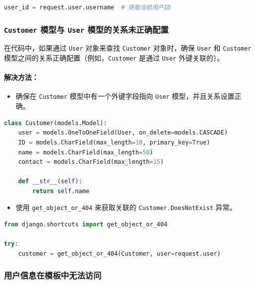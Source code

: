 \documentclass[UTF8,a4paper,12pt]{ctexart}
\begin{document}
\begin{lstlisting}[language=Python]
    user_id = request.user.username  # 获取当前用户ID
\end{lstlisting}

\subsubsection{\texttt{Customer} 模型与 \texttt{User} 模型的关系未正确配置}

在代码中，如果通过 \texttt{User} 对象来查找 \texttt{Customer} 对象时，确保 \texttt{User} 和 \texttt{Customer} 模型之间的关系正确配置（例如，\texttt{Customer} 是通过 \texttt{User} 外键关联的）。

\paragraph{解决方法：}
\begin{itemize}
    \item 确保在 \texttt{Customer} 模型中有一个外键字段指向 \texttt{User} 模型，并且关系设置正确。
\end{itemize}

\begin{lstlisting}[language=Python]
    class Customer(models.Model):
    user = models.OneToOneField(User, on_delete=models.CASCADE)
    ID = models.CharField(max_length=10, primary_key=True)  
    name = models.CharField(max_length=50)
    contact = models.CharField(max_length=15)

    def __str__(self):
        return self.name
\end{lstlisting}

\begin{itemize}
    \item 使用 \verb|get_object_or_404| 来获取关联的 \verb|Customer.DoesNotExist| 异常。
\end{itemize}



\begin{lstlisting}[language=Python]
from django.shortcuts import get_object_or_404  

try:
    customer = get_object_or_404(Customer, user=request.user)
\end{lstlisting}

\subsubsection{用户信息在模板中无法访问}
\end{document}

